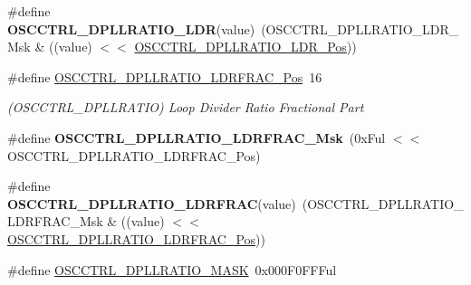 \begin{DoxyCompactItemize}
\item 
\hypertarget{group___s_a_m_l21___o_s_c_c_t_r_l_gaf0e37ef079cd295b2f12a71adc028813}{}\#define {\bfseries O\+S\+C\+C\+T\+R\+L\+\_\+\+D\+P\+L\+L\+R\+A\+T\+I\+O\+\_\+\+L\+D\+R}(value)~(O\+S\+C\+C\+T\+R\+L\+\_\+\+D\+P\+L\+L\+R\+A\+T\+I\+O\+\_\+\+L\+D\+R\+\_\+\+Msk \& ((value) $<$$<$ \hyperlink{group___s_a_m_l21___o_s_c_c_t_r_l_ga8eca3bc229c889cd3d3779dc929c643f}{O\+S\+C\+C\+T\+R\+L\+\_\+\+D\+P\+L\+L\+R\+A\+T\+I\+O\+\_\+\+L\+D\+R\+\_\+\+Pos}))\label{group___s_a_m_l21___o_s_c_c_t_r_l_gaf0e37ef079cd295b2f12a71adc028813}

\item 
\hypertarget{group___s_a_m_l21___o_s_c_c_t_r_l_gaef38c55c07d00397f447987ed0bc9bcc}{}\#define \hyperlink{group___s_a_m_l21___o_s_c_c_t_r_l_gaef38c55c07d00397f447987ed0bc9bcc}{O\+S\+C\+C\+T\+R\+L\+\_\+\+D\+P\+L\+L\+R\+A\+T\+I\+O\+\_\+\+L\+D\+R\+F\+R\+A\+C\+\_\+\+Pos}~16\label{group___s_a_m_l21___o_s_c_c_t_r_l_gaef38c55c07d00397f447987ed0bc9bcc}

\begin{DoxyCompactList}\small\item\em (O\+S\+C\+C\+T\+R\+L\+\_\+\+D\+P\+L\+L\+R\+A\+T\+I\+O) Loop Divider Ratio Fractional Part \end{DoxyCompactList}\item 
\hypertarget{group___s_a_m_l21___o_s_c_c_t_r_l_ga1ff6e6ccb23cf270bd46fae22691cb7f}{}\#define {\bfseries O\+S\+C\+C\+T\+R\+L\+\_\+\+D\+P\+L\+L\+R\+A\+T\+I\+O\+\_\+\+L\+D\+R\+F\+R\+A\+C\+\_\+\+Msk}~(0x\+Ful $<$$<$ O\+S\+C\+C\+T\+R\+L\+\_\+\+D\+P\+L\+L\+R\+A\+T\+I\+O\+\_\+\+L\+D\+R\+F\+R\+A\+C\+\_\+\+Pos)\label{group___s_a_m_l21___o_s_c_c_t_r_l_ga1ff6e6ccb23cf270bd46fae22691cb7f}

\item 
\hypertarget{group___s_a_m_l21___o_s_c_c_t_r_l_ga918d2c07ba53a2d82955bf7986a7fb57}{}\#define {\bfseries O\+S\+C\+C\+T\+R\+L\+\_\+\+D\+P\+L\+L\+R\+A\+T\+I\+O\+\_\+\+L\+D\+R\+F\+R\+A\+C}(value)~(O\+S\+C\+C\+T\+R\+L\+\_\+\+D\+P\+L\+L\+R\+A\+T\+I\+O\+\_\+\+L\+D\+R\+F\+R\+A\+C\+\_\+\+Msk \& ((value) $<$$<$ \hyperlink{group___s_a_m_l21___o_s_c_c_t_r_l_gaef38c55c07d00397f447987ed0bc9bcc}{O\+S\+C\+C\+T\+R\+L\+\_\+\+D\+P\+L\+L\+R\+A\+T\+I\+O\+\_\+\+L\+D\+R\+F\+R\+A\+C\+\_\+\+Pos}))\label{group___s_a_m_l21___o_s_c_c_t_r_l_ga918d2c07ba53a2d82955bf7986a7fb57}

\item 
\hypertarget{group___s_a_m_l21___o_s_c_c_t_r_l_ga2f63ccd4be69ce0228fea5b36f5759c8}{}\#define \hyperlink{group___s_a_m_l21___o_s_c_c_t_r_l_ga2f63ccd4be69ce0228fea5b36f5759c8}{O\+S\+C\+C\+T\+R\+L\+\_\+\+D\+P\+L\+L\+R\+A\+T\+I\+O\+\_\+\+M\+A\+S\+K}~0x000\+F0\+F\+F\+Ful\label{group___s_a_m_l21___o_s_c_c_t_r_l_ga2f63ccd4be69ce0228fea5b36f5759c8}


\end{DoxyCompactItemize}
